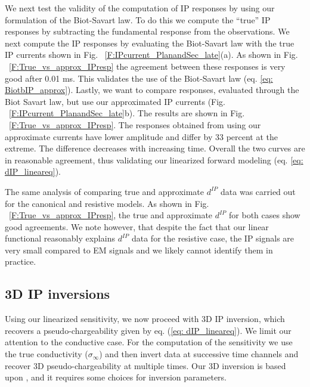 \documentclass[extra,mreferee]{gji}
\newcommand{\siginf}{\sigma_\infty}
\newcommand{\dip}{d^{IP}}
\begin{document}
We next test the validity of the computation of IP responses by using our formulation of the Biot-Savart law. To do this we compute the ``true'' IP responses  by subtracting the fundamental response from the observations. We next compute the IP responses by evaluating the Biot-Savart law with the true IP currents shown in Fig. ~\ref{F:IPcurrent_PlanandSec_late}(a). As shown in Fig. ~\ref{F:True_vs_approx_IPresp} the agreement between these responses is very good after 0.01 ms. This validates the use of the Biot-Savart law (eq. \ref{eq: BiotbIP_approx}). Lastly, we want to compare responses, evaluated through the Biot Savart law, but use our approximated IP currents (Fig. ~\ref{F:IPcurrent_PlanandSec_late}b). The results are shown in Fig. ~\ref{F:True_vs_approx_IPresp}. The responses obtained from using our approximate currents have lower amplitude and differ by 33 percent at the extreme. The difference decreases with increasing time. Overall the two curves are in reasonable agreement, thus validating our linearized forward modeling (eq. \ref{eq: dIP_lineareq}).

The same analysis of comparing true and approximate $\dip$ data was carried out for the canonical and resistive models.
As shown in  Fig. ~\ref{F:True_vs_approx_IPresp}, the true and approximate $\dip$ for both cases show good agreements.
We note however, that despite the fact that our linear functional reasonably explains $\dip$ data for the resistive case, the IP signals are very small compared to EM signals and we likely cannot identify them in practice.


\subsection{3D IP inversions}
Using our linearized sensitivity, we now proceed with 3D IP inversion, which recovers a pseudo-chargeability given by eq. (\ref{eq: dIP_lineareq}).
We limit our attention to the conductive case. For the computation of the sensitivity we use the true conductivity ($\siginf$) and then invert data at successive time channels and recover 3D pseudo-chargeability at multiple times.
Our 3D inversion is based upon \cite[]{doug1994,Li2000}, and it requires some choices for inversion parameters.
\end{document}
